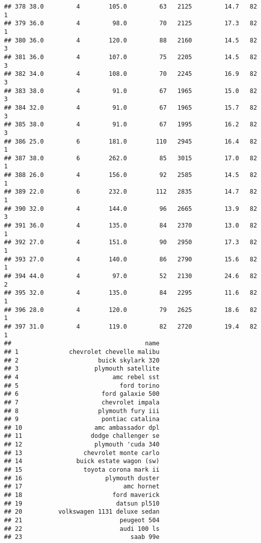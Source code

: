 \documentclass[
]{article}
\begin{document}
\begin{verbatim}
## 378 38.0         4        105.0         63   2125         14.7   82      1
## 379 36.0         4         98.0         70   2125         17.3   82      1
## 380 36.0         4        120.0         88   2160         14.5   82      3
## 381 36.0         4        107.0         75   2205         14.5   82      3
## 382 34.0         4        108.0         70   2245         16.9   82      3
## 383 38.0         4         91.0         67   1965         15.0   82      3
## 384 32.0         4         91.0         67   1965         15.7   82      3
## 385 38.0         4         91.0         67   1995         16.2   82      3
## 386 25.0         6        181.0        110   2945         16.4   82      1
## 387 38.0         6        262.0         85   3015         17.0   82      1
## 388 26.0         4        156.0         92   2585         14.5   82      1
## 389 22.0         6        232.0        112   2835         14.7   82      1
## 390 32.0         4        144.0         96   2665         13.9   82      3
## 391 36.0         4        135.0         84   2370         13.0   82      1
## 392 27.0         4        151.0         90   2950         17.3   82      1
## 393 27.0         4        140.0         86   2790         15.6   82      1
## 394 44.0         4         97.0         52   2130         24.6   82      2
## 395 32.0         4        135.0         84   2295         11.6   82      1
## 396 28.0         4        120.0         79   2625         18.6   82      1
## 397 31.0         4        119.0         82   2720         19.4   82      1
##                                     name
## 1              chevrolet chevelle malibu
## 2                      buick skylark 320
## 3                     plymouth satellite
## 4                          amc rebel sst
## 5                            ford torino
## 6                       ford galaxie 500
## 7                       chevrolet impala
## 8                      plymouth fury iii
## 9                       pontiac catalina
## 10                    amc ambassador dpl
## 11                   dodge challenger se
## 12                    plymouth 'cuda 340
## 13                 chevrolet monte carlo
## 14               buick estate wagon (sw)
## 15                 toyota corona mark ii
## 16                       plymouth duster
## 17                            amc hornet
## 18                         ford maverick
## 19                          datsun pl510
## 20          volkswagen 1131 deluxe sedan
## 21                           peugeot 504
## 22                           audi 100 ls
## 23                              saab 99e

\end{verbatim}
\end{document}
